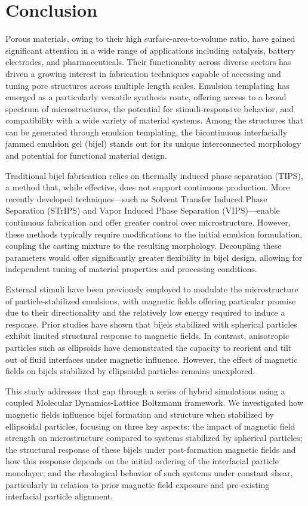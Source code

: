 \section{Conclusion}

Porous materials, owing to their high surface-area-to-volume ratio, have gained significant attention in a wide range of 
applications including catalysis, battery electrodes, and pharmaceuticals. Their functionality across diverse sectors has 
driven a growing interest in fabrication techniques capable of accessing and tuning pore structures across multiple length 
scales. Emulsion templating has emerged as a particularly versatile synthesis route, offering access to a broad spectrum of 
microstructures, the potential for stimuli-responsive behavior, and compatibility with a wide variety of material systems. 
Among the structures that can be generated through emulsion templating, the bicontinuous interfacially jammed emulsion gel 
(bijel) stands out for its unique interconnected morphology and potential for functional material design.

Traditional bijel fabrication relies on thermally induced phase separation (TIPS), a method that, while effective, does not 
support continuous production. More recently developed techniques—such as Solvent Transfer Induced Phase Separation (STrIPS) 
and Vapor Induced Phase Separation (VIPS)—enable continuous fabrication and offer greater control over microstructure. However, 
these methods typically require modifications to the initial emulsion formulation, coupling the casting mixture to the resulting 
morphology. Decoupling these parameters would offer significantly greater flexibility in bijel design, allowing for independent 
tuning of material properties and processing conditions.

External stimuli have been previously employed to modulate the microstructure of particle-stabilized emulsions, with magnetic 
fields offering particular promise due to their directionality and the relatively low energy required to induce a response. Prior 
studies have shown that bijels stabilized with spherical particles exhibit limited structural response to magnetic fields. In 
contrast, anisotropic particles such as ellipsoids have demonstrated the capacity to reorient and tilt out of fluid interfaces 
under magnetic influence. However, the effect of magnetic fields on bijels stabilized by ellipsoidal particles remains unexplored.

This study addresses that gap through a series of hybrid simulations using a coupled Molecular Dynamics-Lattice Boltzmann framework. 
We investigated how magnetic fields influence bijel formation and structure when stabilized by ellipsoidal particles, focusing on 
three key aspects: the impact of magnetic field strength on microstructure compared to systems stabilized by spherical particles; 
the structural response of these bijels under post-formation magnetic fields and how this response depends on the initial ordering 
of the interfacial particle monolayer; and the rheological behavior of such systems under constant shear, particularly in relation 
to prior magnetic field exposure and pre-existing interfacial particle alignment.

